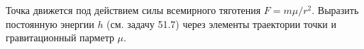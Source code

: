 Точка движется под действием силы всемирного тяготения $F=m\mu/r^2$. Выразить постоянную энергии $h$ (см. задачу 51.7)
через элементы траектории точки и гравитационный парметр $\mu$.